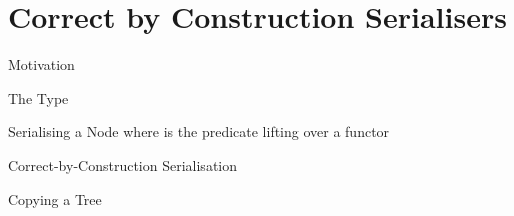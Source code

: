 \section{Correct by Construction Serialisers}

\begin{frame}{Motivation}
  \small{}
\end{frame}

\begin{frame}{The  Type}
  \vfill
\end{frame}

\begin{frame}{Serialising a Node}
  \vfill
  where  is the predicate lifting over a functor
\end{frame}

\begin{frame}{Correct-by-Construction Serialisation}
\end{frame}

\begin{frame}{Copying a Tree}
  \vfill
\end{frame}

